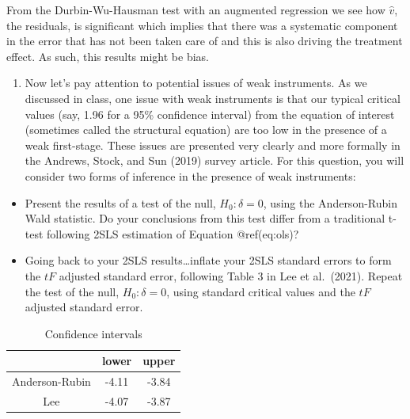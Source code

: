 \documentclass[
  12pt,
]{article}
\providecommand{\tightlist}{%
  \setlength{\itemsep}{0pt}\setlength{\parskip}{0pt}}
\begin{document}
From the Durbin-Wu-Hausman test with an augmented regression we see how
\(\hat{v}\), the residuals, is significant which implies that there was
a systematic component in the error that has not been taken care of and
this is also driving the treatment effect. As such, this results might
be bias.

\begin{enumerate}
\def\labelenumi{\arabic{enumi}.}
\setcounter{enumi}{6}
\tightlist
\item
  Now let's pay attention to potential issues of weak instruments. As we
  discussed in class, one issue with weak instruments is that our
  typical critical values (say, 1.96 for a 95\% confidence interval)
  from the equation of interest (sometimes called the structural
  equation) are too low in the presence of a weak first-stage. These
  issues are presented very clearly and more formally in the Andrews,
  Stock, and Sun (2019) survey article. For this question, you will
  consider two forms of inference in the presence of weak instruments:
\end{enumerate}

\begin{itemize}
\tightlist
\item
  Present the results of a test of the null, \(H_{0}: \delta=0\), using
  the Anderson-Rubin Wald statistic. Do your conclusions from this test
  differ from a traditional t-test following 2SLS estimation of Equation
  @ref(eq:ols)?
\item
  Going back to your 2SLS results\ldots inflate your 2SLS standard
  errors to form the \(tF\) adjusted standard error, following Table 3
  in Lee et al.~(2021). Repeat the test of the null,
  \(H_{0}: \delta=0\), using standard critical values and the \(tF\)
  adjusted standard error.
\end{itemize}

 

\begin{table}[ht]
\centering
\begin{tabular}{ccc}
  \hline
 & lower & upper \\ 
  \hline
Anderson-Rubin & -4.11 & -3.84 \\ 
  Lee & -4.07 & -3.87 \\ 
   \hline
\end{tabular}
\caption{Confidence intervals} 
\label{tab:ci}
\end{table}
\end{document}
